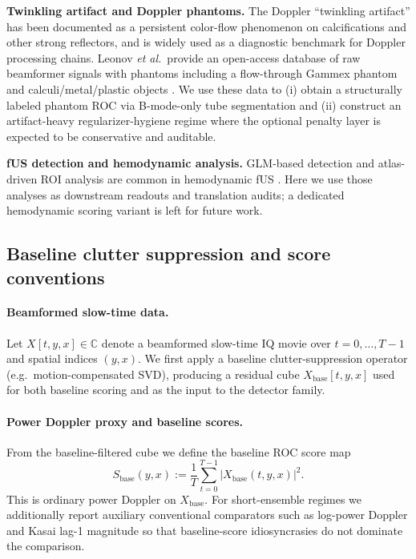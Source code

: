 \documentclass[11pt]{article}
\begin{document}
\textbf{Twinkling artifact and Doppler phantoms.} The Doppler ``twinkling artifact'' has been documented as a persistent color-flow phenomenon on calcifications and other strong reflectors, and is widely used as a diagnostic benchmark for Doppler processing chains. Leonov \emph{et al.}\ provide an open-access database of raw beamformer signals with phantoms including a flow-through Gammex phantom and calculi/metal/plastic objects \cite{LeonovTwinklingDD2021}. We use these data to (i) obtain a structurally labeled phantom ROC via B-mode-only tube segmentation and (ii) construct an artifact-heavy regularizer-hygiene regime where the optional penalty layer is expected to be conservative and auditable.

\textbf{fUS detection and hemodynamic analysis.} GLM-based detection and atlas-driven ROI analysis are common in hemodynamic fUS \cite{Demeneglmband2016,UrbanWholeBrain2015}. Here we use those analyses as downstream readouts and translation audits; a dedicated hemodynamic scoring variant is left for future work.

\subsection{Baseline clutter suppression and score conventions}
\paragraph{Beamformed slow-time data.}
Let $X[t,y,x]\in\mathbb{C}$ denote a beamformed slow-time IQ movie over $t=0,\dots,T-1$ and spatial indices $(y,x)$. We first apply a baseline clutter-suppression operator (e.g.\ motion-compensated SVD), producing a residual cube $X_{\mathrm{base}}[t,y,x]$ used for both baseline scoring and as the input to the detector family.

\paragraph{Power Doppler proxy and baseline scores.}
From the baseline-filtered cube we define the baseline ROC score map
\begin{equation}
  S_{\mathrm{base}}(y,x):=\frac{1}{T}\sum_{t=0}^{T-1}\left|X_{\mathrm{base}}(t,y,x)\right|^2.
  \label{eq:sbase}
\end{equation}
This is ordinary power Doppler on $X_{\mathrm{base}}$. For short-ensemble regimes we additionally report auxiliary conventional comparators such as log-power Doppler and Kasai lag-1 magnitude \cite{KasaiAutocorrelation1985} so that baseline-score idiosyncrasies do not dominate the comparison.
\end{document}
